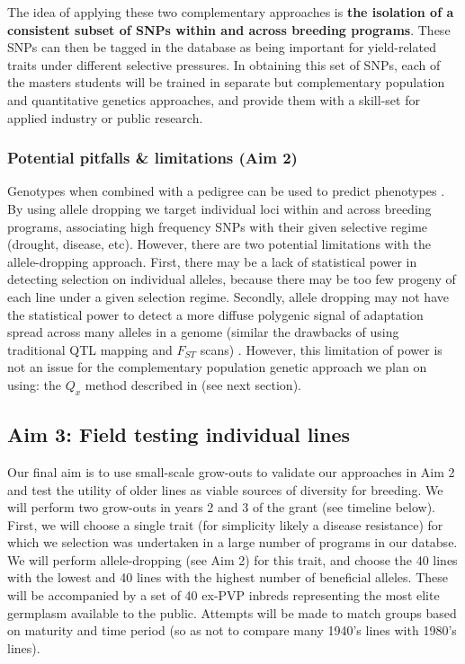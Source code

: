 \documentclass[12pt]{article}
\begin{document}
The idea of applying these two complementary approaches is \textbf{the isolation of a consistent subset of SNPs within and across breeding programs}. 
These SNPs can then be tagged in the database as being important for yield-related traits under different selective pressures.
In obtaining this set of SNPs, each of the masters students will be trained in separate but complementary population and quantitative genetics approaches, and provide them with a skill-set for applied industry or public research. 

\subsubsection*{Potential pitfalls \& limitations (Aim 2)}
Genotypes when combined with a pedigree can be used to predict phenotypes \citep{de2009predicting,crossa2010prediction,Decker:2012kd}.
By using allele dropping we target individual loci within and across breeding programs, associating high frequency SNPs with their given selective regime (drought, disease, etc). 
However, there are two potential limitations with the allele-dropping approach. First, there may be a lack of statistical power in detecting selection on individual alleles, because there may be too few progeny of each line under a given selection regime. 
Secondly, allele dropping may not have the statistical power to detect a more diffuse polygenic signal of adaptation spread across many alleles in a genome (similar the drawbacks of using traditional QTL mapping and $F_{ST}$ scans) \cite{Rockman:2011ej, Berg:2014bs}. 
However, this limitation of power is not an issue for the complementary population genetic approach we plan on using: the $Q_{x}$ method described in \cite{Berg:2014bs} (see next section). 

\subsection*{Aim 3: Field testing individual lines}

Our final aim is to use small-scale grow-outs to validate our approaches in Aim 2 and test the utility of older lines as viable sources of diversity for breeding.
We will perform two grow-outs in years 2 and 3 of the grant (see timeline below).
First, we will choose a single trait (for simplicity likely a disease resistance) for which we selection was undertaken in a large number of programs in our databse.
We will perform allele-dropping (see Aim 2) for this trait, and choose the 40 lines with the lowest and 40 lines with the highest number of beneficial alleles.
These will be accompanied by a set of 40 ex-PVP inbreds representing the most elite germplasm available to the public. 
Attempts will be made to match groups based on maturity and time period (so as not to compare many 1940's lines with 1980's lines).
\end{document}

